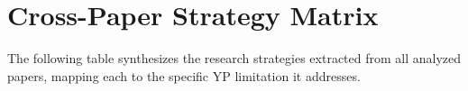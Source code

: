 \documentclass[12pt, a4paper]{article}
\begin{document}









\section{Cross-Paper Strategy Matrix}
\label{sec:matrix}

The following table synthesizes the research strategies extracted from all analyzed papers, mapping each to the specific YP limitation it addresses.
\end{document}
